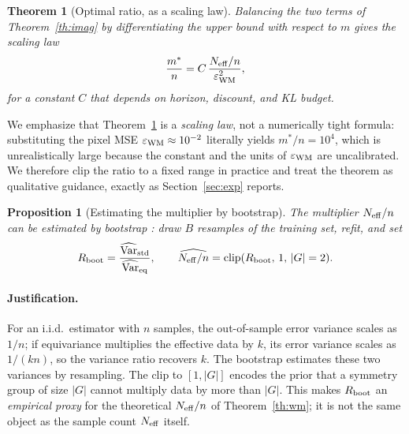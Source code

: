 \documentclass[preprint,12pt]{elsarticle}
\newtheorem{theorem}{Theorem}
\newtheorem{proposition}{Proposition}
\begin{document}
\begin{theorem}[Optimal ratio, as a scaling law]\label{th:ratio}
Balancing the two terms of Theorem~\ref{th:imag} by differentiating the upper
bound with respect to $m$ gives the scaling law
\begin{equation}
  \frac{m^*}{n}=C\,\frac{N_{\rm eff}/n}{\varepsilon_{\rm WM}^{2}},
\end{equation}
for a constant $C$ that depends on horizon, discount, and KL budget.
\end{theorem}

We emphasize that Theorem~\ref{th:ratio} is a \emph{scaling law}, not a
numerically tight formula: substituting the pixel MSE
$\varepsilon_{\rm WM}\approx10^{-2}$ literally yields $m^*/n=10^4$, which is
unrealistically large because the constant and the units of
$\varepsilon_{\rm WM}$ are uncalibrated. We therefore clip the ratio to a
fixed range in practice and treat the theorem as qualitative guidance,
exactly as Section~\ref{sec:exp} reports.

\begin{proposition}[Estimating the multiplier by bootstrap]\label{prop:meff}
The multiplier $N_{\rm eff}/n$ can be estimated by bootstrap
\cite{bootstrap1993}: draw $B$ resamples of the training set, refit, and set
\begin{equation}
  R_{\rm boot}=\frac{\widehat{\operatorname{Var}}_{\rm std}}{\widehat{\operatorname{Var}}_{\rm eq}},
  \qquad
  \widehat{N_{\rm eff}/n}=\operatorname{clip}(R_{\rm boot},\,1,\,|G|=2).
\end{equation}
\end{proposition}

\paragraph{Justification.}
For an i.i.d.\ estimator with $n$ samples, the out-of-sample error variance
scales as $1/n$; if equivariance multiplies the effective data by $k$, its
error variance scales as $1/(kn)$, so the variance ratio recovers $k$. The
bootstrap \cite{bootstrap1993} estimates these two variances by resampling.
The clip to $[1,|G|]$ encodes the prior that a symmetry group of size $|G|$
cannot multiply data by more than $|G|$. This makes $R_{\rm boot}$ an
\emph{empirical proxy} for the theoretical $N_{\rm eff}/n$ of
Theorem~\ref{th:wm}; it is not the same object as the sample count $N_{\rm eff}$ itself.

\end{document}

